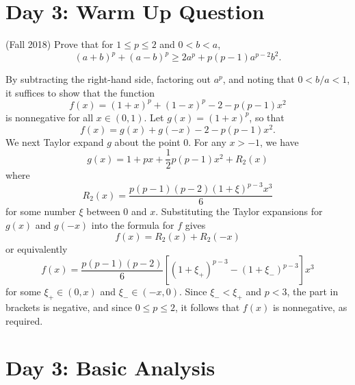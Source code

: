 \documentclass[answers]{exam}
\begin{document}
\begin{questions}
\section{Day 3: Warm Up Question}

\question (Fall 2018) 
Prove that for $1\leq p \leq 2$ and $0<b<a$, $$(a+b)^p + (a-b)^p \geq 2a^p + p(p-1)a^{p-2}b^2.$$

\begin{solution}
  By subtracting the right-hand side, factoring out $a^p$, and noting that $0<b/a<1$, it suffices to show that the function
  \begin{equation*}
    f(x) = \left( 1+x \right)^{p} + \left( 1-x \right)^{p} - 2 - p(p-1)x ^{2}
  \end{equation*}
  is nonnegative for all $x\in (0,1)$. Let $g(x) = (1+x)^p$, so that
  \begin{equation*}
    f(x) = g(x)+ g(-x) -2 - p(p-1)x^{2}.
  \end{equation*}
  We next Taylor expand $g$ about the point $0$.
  For any $x>-1$, we have
  \begin{equation*}
    g(x) = 1 + px + \frac{1}{2}p(p-1)x^{2} + R_{2}(x)
  \end{equation*}
  where
  \begin{equation*}
    R_{2}(x)= \frac{p(p-1)(p-2)(1+\xi)^{p-3}x^{3}}{6}
  \end{equation*}
  for some number $\xi$ between $0$ and $x$. Substituting the Taylor expansions for $g(x)$ and $g(-x)$ into the formula for $f$ gives
  \begin{equation*}
    f(x) = R_{2}(x) + R_{2}(-x)
  \end{equation*}
  or equivalently
  \begin{equation*}
    f(x) = \frac{p(p-1)(p-2)}{6} \left[(1+\xi_{+})^{p-3}-(1+\xi_{-})^{p-3}\right]x^{3}
  \end{equation*}
  for some $\xi_{+}\in(0,x)$ and $\xi_{-}\in(-x,0)$. Since $\xi_{-}<\xi_{+}$ and $p<3$, the part in brackets is negative, and since $0\leq p \leq 2$, it follows that $f(x)$ is nonnegative, as required.
\end{solution}




\newpage
\section{Day 3: Basic Analysis}


\end{questions}
\end{document}

